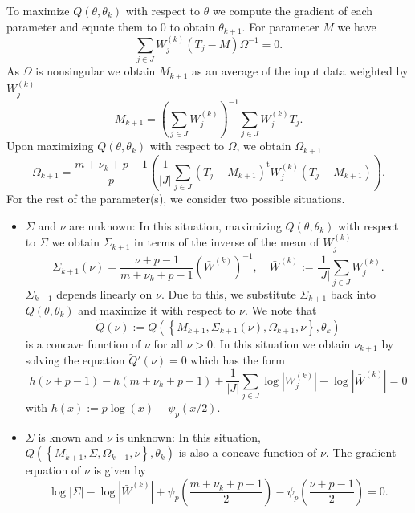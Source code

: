 \documentclass[english,listof=totoc]{scrartcl}
\begin{document}
To maximize $Q(\theta,\theta_k)$ with respect to $\theta$ we compute
the gradient of each parameter and equate them to $0$ to obtain
$\theta_{k+1}$. For parameter $M$ we have
\begin{equation}
\sum_{j\in J}W_j^{(k)}\left(T_j-M\right)\Omega^{-1}=0.
\end{equation}
As $\Omega$ is nonsingular we obtain $M_{k+1}$ as an average of the
input data weighted by $W_j^{(k)}$
\begin{equation}
M_{k+1}=\left(\sum_{j\in J}W_j^{(k)}\right)^{-1}\sum_{j\in J}W_j^{(k)}T_j.\label{eq:M}
\end{equation}
Upon maximizing $Q(\theta,\theta_k)$ with respect to $\Omega$, we obtain
$\Omega_{k+1}$
\begin{equation}
\Omega_{k+1}=\frac{m+\nu_k+p-1}{p}\left(\frac{1}{|J|}\sum_{j\in J}(T_j-M_{k+1})^{\textrm{t}}W_j^{(k)}(T_j-M_{k+1})\right).\label{eq:Omega}
\end{equation}
For the rest of the parameter(s), we consider two possible situations.
\begin{itemize}
\item $\Sigma$ and $\nu$ are unknown: In this situation, maximizing
	$Q(\theta,\theta_k)$ with respect to $\Sigma$ we obtain
	$\Sigma_{k+1}$ in terms of the inverse of the mean of
	$W_j^{{(k)}}$
\begin{equation}
\Sigma_{k+1}(\nu)=\frac{\nu+p-1}{m+\nu_k+p-1}\left(\bar{W}^{(k)}\right)^{-1},\quad \bar{W}^{(k)}:=\frac{1}{|J|}\sum_{j\in J}W_j^{(k)}.\label{eq:Sigma}
\end{equation}
$\Sigma_{k+1}$ depends linearly on $\nu$. Due to this, we substitute
$\Sigma_{k+1}$ back into $Q(\theta,\theta_k)$ and maximize it with
respect to $\nu$. We note that
\[\tilde{Q}(\nu):=Q\left(\left\{M_{k+1},\Sigma_{k+1}(\nu),\Omega_{k+1},\nu\right\},\theta_k\right)\]
is a concave function of $\nu$ for all $\nu>0$. In this
situation we obtain $\nu_{k+1}$ by solving the equation
$\tilde{Q}'(\nu)=0$ which has the form
\begin{equation}
h(\nu+p-1)-h(m+\nu_k+p-1)+\frac{1}{|J|}\sum_{j\in J}\log|W_j^{(k)}|-\log |\bar{W}^{(k)}|=0\label{eq:nu1}
\end{equation}
with $h(x):=p\log(x)-\psi_p(x/2)$.
\item $\Sigma$ is known and $\nu$ is unknown: In this situation, $Q\left(\left\{M_{k+1},\Sigma,\Omega_{k+1},\nu\right\},\theta_k\right)$ is also a concave function of $\nu$. The gradient equation of $\nu$ is given by
\begin{equation}
\log|\Sigma|-\log |\bar{W}^{(k)}|+\psi_{p}\left(\frac{m+\nu_k+p-1}{2}\right)-\psi_{p}\left(\frac{\nu+p-1}{2}\right)=0.\label{eq:nu2}
\end{equation}
\end{itemize}
\end{document}
